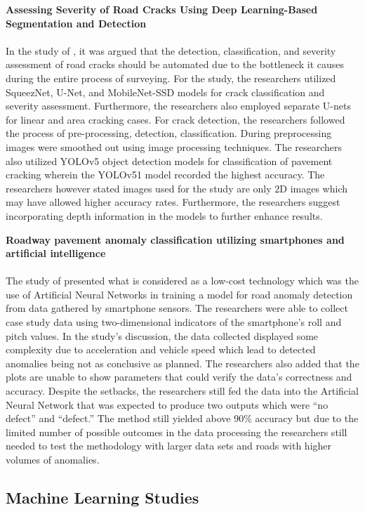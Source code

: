 \noindent\textbf{\large Assessing Severity of Road Cracks Using Deep Learning-Based Segmentation and Detection} \\\\
In the study of , it was argued that the detection, classification, and severity assessment of road cracks should be automated due to the bottleneck it causes during the entire process of surveying. For the study, the researchers utilized SqueezNet, U-Net, and MobileNet-SSD models for crack classification and severity assessment. Furthermore, the researchers also employed separate U-nets for linear and area cracking cases. For crack detection, the researchers followed the process of pre-processing, detection, classification. During preprocessing images were smoothed out using image processing techniques. The researchers also utilized YOLOv5 object detection models for classification of pavement cracking wherein the YOLOv51 model recorded the highest accuracy. The researchers however stated images used for the study are only 2D images which may have allowed higher accuracy rates. Furthermore, the researchers suggest incorporating depth information in the models to further enhance results.

\noindent\textbf{\large Roadway pavement anomaly classification utilizing smartphones and artificial intelligence} \\\\
The study of  presented what is considered as a low-cost technology which was the use of Artificial Neural Networks in training a model for road anomaly detection from data gathered by smartphone sensors. The researchers were able to collect case study data using two-dimensional indicators of the smartphone’s roll and pitch values. In the study’s discussion, the data collected displayed some complexity due to acceleration and vehicle speed which lead to detected anomalies being not as conclusive as planned. The researchers also added that the plots are unable to show parameters that could verify the data’s correctness and accuracy. Despite the setbacks, the researchers still fed the data into the Artificial Neural Network that was expected to produce two outputs which were “no defect” and “defect.” The method still yielded above 90\% accuracy but due to the limited number of possible outcomes in the data processing the researchers still needed to test the methodology with larger data sets and roads with higher volumes of anomalies.

\subsection{Machine Learning Studies}

